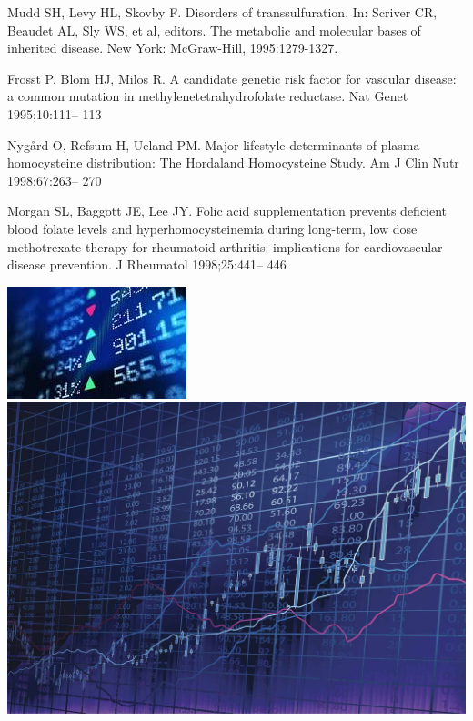 \documentclass{article}
\begin{document}
\begin{thebibliography} {}

Mudd SH, Levy HL, Skovby F. Disorders of transsulfuration.
In: Scriver CR, Beaudet AL, Sly WS, et al, editors. The
metabolic and molecular bases of inherited disease. New York:
McGraw-Hill, 1995:1279-1327.

 Frosst P, Blom HJ, Milos R. A candidate genetic risk factor for
vascular disease: a common mutation in
methylenetetrahydrofolate reductase. Nat Genet 1995;10:111–
113

 Nygård O, Refsum H, Ueland PM. Major lifestyle
determinants of plasma homocysteine distribution: The
Hordaland Homocysteine Study. Am J Clin Nutr 1998;67:263–
270

 Morgan SL, Baggott JE, Lee JY. Folic acid supplementation
prevents deficient blood folate levels and
hyperhomocysteinemia during long-term, low dose
methotrexate therapy for rheumatoid arthritis: implications for
cardiovascular disease prevention. J Rheumatol 1998;25:441–
446




\end{thebibliography} 
\includegraphics[width=\textwidth]{stock}
\includegraphics[width=\textwidth]{stock3}
\end{document}

